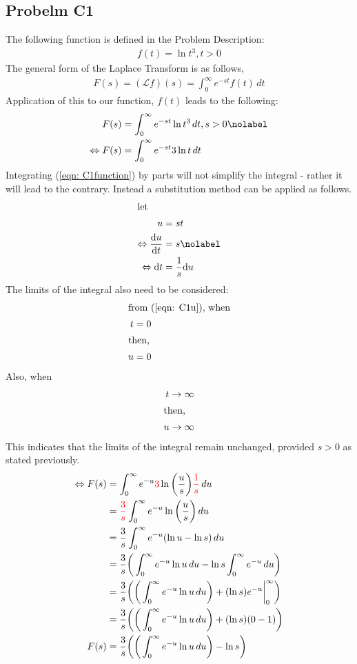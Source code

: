 \documentclass[a4paper,10pt,reqno]{amsart}
\numberwithin{equation}{section}
\begin{document}
\subsection{Probelm C1}\label{sec:c1}
The following function is defined in the Problem Description:
\begin{align}
f(t) = \ln t^3, t>0 \label{eqn: C1function}
\end{align}
The general form of the Laplace Transform is as follows,
\begin{align}
F(s) = (\mathscr{L}f)(s) =  \int_{0}^{\infty} e^{-st}f(t) \,dt  \label{eqn: Laplace}
\end{align}
Application of this to our function, $f(t)$ leads to the following:
\begin{align}
F(s) &= \int_{0}^{\infty} e^{-st} \ln t^3 \,dt, s>0  \nolabel \\
\Leftrightarrow F(s) &= \int_{0}^{\infty} e^{-st} 3\ln t \,dt  \label{eqn: C1beginning}
\end{align}
Integrating (\ref{eqn: C1function}) by parts will not simplify the integral - rather it will lead to the contrary. Instead a substitution method can be applied as follows.
\begin{align}
\intertext{let}
u &=st \label{eqn: C1u} \\
\Leftrightarrow \frac{\mathrm{d}u}{\mathrm{d}t} &= s \nolabel \\
\Leftrightarrow \mathrm{d}t &= \frac{1}{s} \mathrm{d}u \label{eqn: c1dt}
\end{align}
The limits of the integral also need to be considered:
\begin{align*}
\intertext{from (\ref{eqn: C1u}), when}
t &= 0 \\
\intertext{then,}
u &= 0 
\end{align*}
Also, when
\begin{align*}
t \rightarrow \infty \\
\intertext{then,}
u \rightarrow \infty \\
\end{align*}
This indicates that the limits of the integral remain unchanged, provided $s>0$ as stated previously.
\begin{align}
\Leftrightarrow F(s) &= \int_{0}^{\infty} e^{-u} \textcolor{red}{3}\ln \bigg(\frac{u}{s}\bigg) \textcolor{red}{\frac{1}{s}} \,du  \nonumber \\
&= \textcolor{red}{\frac{3}{s}} \int_{0}^{\infty} e^{-u} \ln \bigg(\frac{u}{s}\bigg) \,du  \nonumber \\
&= \frac{3}{s} \int_{0}^{\infty} e^{-u} (\ln u - \ln s) \,du  \nonumber \\
&= \frac{3}{s} \bigg( \int_{0}^{\infty} e^{-u} \ln u \,du - \ln s  \int_{0}^{\infty} e^{-u} \,du \bigg) \nonumber \\
&= \frac{3}{s} \bigg(\bigg( \int_{0}^{\infty} e^{-u} \ln u \,du \bigg) + (\ln s) e^{-u} \bigg|_0^\infty \bigg) \nonumber \\
&= \frac{3}{s} \bigg(\bigg( \int_{0}^{\infty} e^{-u} \ln u \,du \bigg) + (\ln s) (0-1) \bigg) \nonumber \\
F(s)&= \frac{3}{s} \bigg(\bigg( \int_{0}^{\infty} e^{-u} \ln u \,du \bigg) - \ln s \bigg) \label{eqn: C1halfway}
\end{align}
\end{document}
